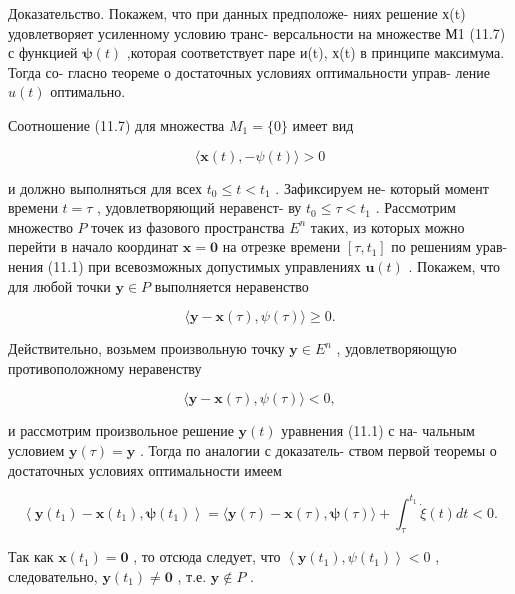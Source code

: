 \documentclass[8pt]{extarticle}
\begin{document}
Доказательство. Покажем, что при данных предположе- ниях решение х(t) удовлетворяет усиленному условию транс- версальности на множестве М1 (11.7) с функцией \(\mathbf{\psi }\left( t\right)\) ,которая соответствует паре и(t), х(t) в принципе максимума. Тогда со- гласно теореме о достаточных условиях оптимальности управ- ление \(u\left( t\right)\) оптимально.

Соотношение (11.7) для множества \({M}_{1} = \{ 0\}\) имеет вид

\[
\langle \mathbf{x}\left( t\right) , - \psi \left( t\right) \rangle  > 0 \tag{11.13}
\]

и должно выполняться для всех \({t}_{0} \leq  t < {t}_{1}\) . Зафиксируем не- который момент времени \(t = \tau\) , удовлетворяющий неравенст- ву \({t}_{0} \leq  \tau  < {t}_{1}\) . Рассмотрим множество \(P\) точек из фазового пространства \({E}^{n}\) таких, из которых можно перейти в начало координат \(\mathbf{x} = \mathbf{0}\) на отрезке времени \(\left\lbrack  {\tau ,{t}_{1}}\right\rbrack\) по решениям урав- нения (11.1) при всевозможных допустимых управлениях \(\mathbf{u}\left( t\right)\) . Покажем, что для любой точки \(\mathbf{y} \in  P\) выполняется неравенство

\[
\langle \mathbf{y} - \mathbf{x}\left( \tau \right) ,\psi \left( \tau \right) \rangle  \geq  0. \tag{11.14}
\]

Действительно, возьмем произвольную точку \(\mathbf{y} \in  {E}^{n}\) , удовлетворяющую противоположному неравенству

\[
\langle \mathbf{y} - \mathbf{x}\left( \tau \right) ,\psi \left( \tau \right) \rangle  < 0,
\]

и рассмотрим произвольное решение \(\mathbf{y}\left( t\right)\) уравнения (11.1) с на- чальным условием \(\mathbf{y}\left( \tau \right)  = \mathbf{y}\) . Тогда по аналогии с доказатель- ством первой теоремы о достаточных условиях оптимальности имеем

\[
\left\langle  {\mathbf{y}\left( {t}_{1}\right)  - \mathbf{x}\left( {t}_{1}\right) ,\mathbf{\psi }\left( {t}_{1}\right) }\right\rangle   = \langle \mathbf{y}\left( \tau \right)  - \mathbf{x}\left( \tau \right) ,\mathbf{\psi }\left( \tau \right) \rangle  + {\int }_{\tau }^{{t}_{1}}\dot{\xi }\left( t\right) {dt} < 0.
\]

Так как \(\mathbf{x}\left( {t}_{1}\right)  = \mathbf{0}\) , то отсюда следует, что \(\left\langle  {\mathbf{y}\left( {t}_{1}\right) ,\psi \left( {t}_{1}\right) }\right\rangle   < 0\) , следовательно, \(\mathbf{y}\left( {t}_{1}\right)  \neq  \mathbf{0}\) , т.е. \(\mathbf{y} \notin  P\) .
\end{document}
